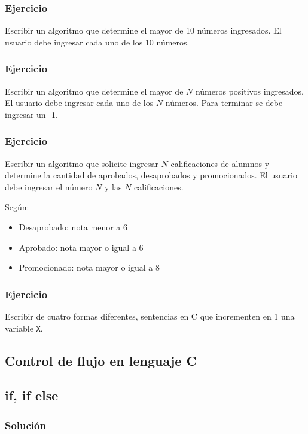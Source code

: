 \subsubsection{Ejercicio}
Escribir un algoritmo que determine el mayor de 10 números ingresados. El usuario debe ingresar cada uno de los 10 números.

\subsubsection{Ejercicio}
Escribir un algoritmo que determine el mayor de $N$ números positivos ingresados. El usuario debe ingresar cada uno de los $N$ números. Para terminar se debe ingresar un -1.

\subsubsection{Ejercicio}
Escribir un algoritmo que solicite ingresar $N$ calificaciones de alumnos y determine la cantidad de aprobados, desaprobados y promocionados. 
El usuario debe ingresar el número $N$ y las $N$ calificaciones.

\underline{Según:}
\begin{itemize}
  \item Desaprobado: nota menor a 6
  \item Aprobado: nota mayor o igual a 6
  \item Promocionado: nota mayor o igual a 8
\end{itemize}

\subsubsection{Ejercicio}
Escribir de cuatro formas diferentes, sentencias en C que incrementen en 1 una variable \texttt{X}.

\subsection*{Control de flujo en lenguaje C}

\subsection*{if, if else}

\subsubsection{Solución}

